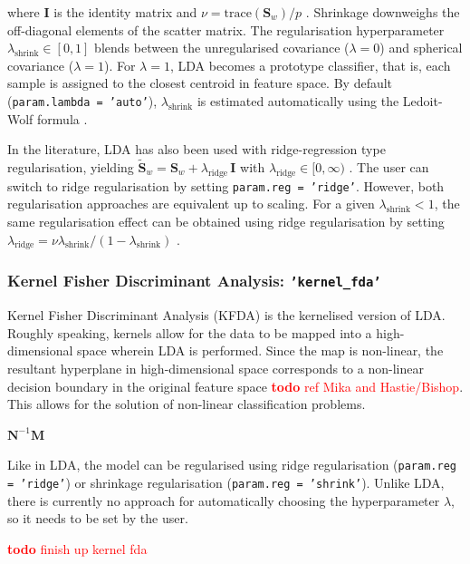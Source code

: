 \documentclass[utf8]{frontiersSCNS} %
\newcommand{\I}{\mathbf{I}}
\renewcommand{\S}{\mathbf{S}}
\newcommand{\ttt}[1]{\texttt{#1}}
\newcommand{\todo}[1]{\textcolor{red}{\textbf{todo} #1}}
\begin{document}
where $\I$ is the identity matrix and $\nu = \text{trace}(\S_w)/p$ \cite{Blankertz2011}. Shrinkage downweighs the off-diagonal elements of the scatter matrix. The regularisation hyperparameter $\lambda_\text{shrink}\in [0,1]$ blends between the unregularised covariance ($\lambda=0$) and spherical covariance ($\lambda=1$). For $\lambda=1$, LDA becomes a prototype classifier, that is, each sample is assigned to the closest centroid in feature space. By default (\ttt{param.lambda = 'auto'}), $\lambda_\text{shrink}$ is estimated automatically using the Ledoit-Wolf formula \cite{Ledoit2003HoneyMatrix,Blankertz2011}.

In the literature, LDA has also been used with ridge-regression type regularisation, yielding $\widetilde{\S}_w = \S_w + \lambda_\text{ridge}\,\I$ with $\lambda_\text{ridge}\in [0,\infty)$ \cite{Friedman1989RegularizedAnalysis}. The user can switch to ridge regularisation by setting \ttt{param.reg = 'ridge'}. However, both regularisation approaches are equivalent up to scaling. For a given $\lambda_\text{shrink}<1$, the same regularisation effect can be obtained using ridge regularisation by setting $\lambda_\text{ridge} = \nu\lambda_\text{shrink} / (1-\lambda_\text{shrink})$
\cite{Treder2018Cross-validationLDA}.


\subsubsection{Kernel Fisher Discriminant Analysis: \ttt{'kernel\_fda'}}

Kernel Fisher Discriminant Analysis (KFDA) is the kernelised version of LDA. Roughly speaking, kernels allow for the data to be mapped into a high-dimensional space wherein LDA is performed. Since the map is non-linear, the resultant hyperplane in high-dimensional space corresponds to a non-linear decision boundary in the original feature space \todo{ref Mika and Hastie/Bishop}. This allows for the solution of non-linear classification problems.

$\mathbf{N}^{-1} \mathbf{M}$

Like in LDA, the model can be regularised using ridge regularisation (\ttt{param.reg = 'ridge'}) or shrinkage regularisation (\ttt{param.reg = 'shrink'}). Unlike LDA, there is currently no approach for automatically choosing the hyperparameter $\lambda$, so it needs to be set by the user.

\todo{finish up kernel fda}

\end{document}
